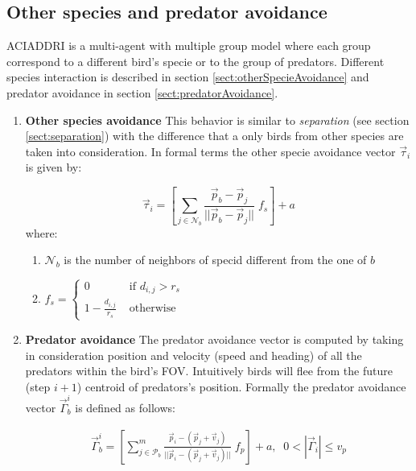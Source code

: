 \subsection{Other species and predator avoidance}
\textsc{ACIADDRI} is a multi-agent with multiple group model where each group correspond to a different bird's specie or to the group of predators. 
Different species interaction is described in section \ref{sect:otherSpecieAvoidance} and predator avoidance in section \ref{sect:predatorAvoidance}.
\begin{enumerate}[-]
	\item \textbf{Other species avoidance}
	\label{sect:otherSpecieAvoidance}
	This behavior is similar to \textit{separation} (see section \ref{sect:separation}) with the difference that a only birds from other species are taken into consideration. In formal terms the other specie avoidance vector  \(\vec{\tau}_i\) is given by:
	
	\begin{equation}
	\vec{\tau}_i = 
		 \left[\sum_{j \in \mathcal{N}_b}{\frac{\vec{p}_b -\vec{p}_j}{||\vec{p}_b - \vec{p}_j||}} \;f_s\right] + a 
	\end{equation}
	where:
	
	\begin{enumerate}
	\item \(\mathcal{N}_b\) is the number of neighbors of specid different from the one of $b$
	\item $
		f_s = \begin{cases}
		0 &\mbox{ if }  d_{i,j} > r_s\\
		1 - \frac{d_{i,j}}{r_s} &\mbox{ otherwise}
		\end{cases}$
	\end{enumerate}
	
	
	\item \textbf{Predator avoidance}
	\label{sect:predatorAvoidance}
	The predator avoidance vector is computed by taking in consideration position and velocity (speed and heading) of all the  predators within the bird's FOV. Intuitively birds will flee from the future (step $i+1$) centroid of predators's position. Formally the predator avoidance vector $\vec{\Gamma}_b^i$ is defined as follows:
	
	\begin{align}
	\vec{\Gamma}_b^i = \left[\sum_{j \in \mathcal{P}_b }^m{\frac{\vec{p}_i -
	(\vec{p}_j+\vec{v}_j)}{||\vec{p}_i - (\vec{p}_j+\vec{v}_j)||}} \;f_{p}\right] +
	a, \;\;0 < |\vec{\Gamma}_i| \leq v_p
	\end{align}
	

\end{enumerate}
